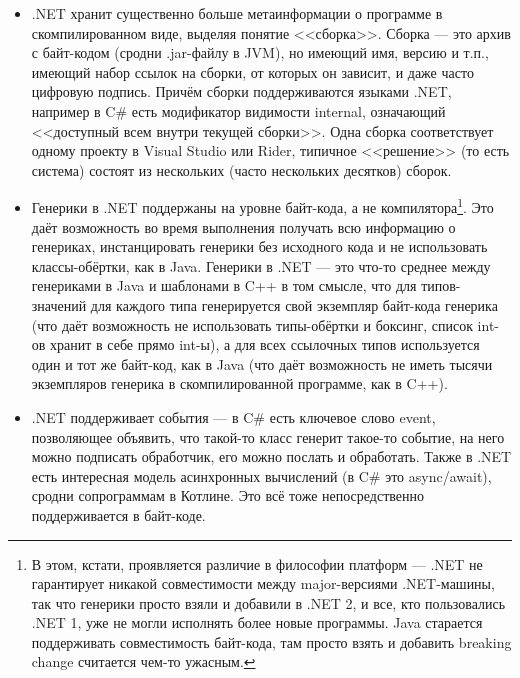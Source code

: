 \documentclass[a5paper]{article}
\begin{document}
\begin{itemize}
    \item .NET хранит существенно больше метаинформации о программе в скомпилированном виде, выделяя понятие <<сборка>>. Сборка --- это архив с байт-кодом (сродни .jar-файлу в JVM), но имеющий имя, версию и т.п., имеющий набор ссылок на сборки, от которых он зависит, и даже часто цифровую подпись. Причём сборки поддерживаются языками .NET, например в C\# есть модификатор видимости internal, означающий <<доступный всем внутри текущей сборки>>. Одна сборка соответствует одному проекту в Visual Studio или Rider, типичное <<решение>> (то есть система) состоят из нескольких (часто нескольких десятков) сборок.
    \item Генерики в .NET поддержаны на уровне байт-кода, а не компилятора\footnote{В этом, кстати, проявляется различие в философии платформ --- .NET не гарантирует никакой совместимости между major-версиями .NET-машины, так что генерики просто взяли и добавили в .NET 2, и все, кто пользовались .NET 1, уже не могли исполнять более новые программы. Java старается поддерживать совместимость байт-кода, там просто взять и добавить breaking change считается чем-то ужасным.}. Это даёт возможность во время выполнения получать всю информацию о генериках, инстанцировать генерики без исходного кода и не использовать классы-обёртки, как в Java. Генерики в .NET --- это что-то среднее между генериками в Java и шаблонами в C++ в том смысле, что для типов-значений для каждого типа генерируется свой экземпляр байт-кода генерика (что даёт возможность не использовать типы-обёртки и боксинг, список int-ов хранит в себе прямо int-ы), а для всех ссылочных типов используется один и тот же байт-код, как в Java (что даёт возможность не иметь тысячи экземпляров генерика в скомпилированной программе, как в C++).
    \item .NET поддерживает события --- в C\# есть ключевое слово event, позволяющее объявить, что такой-то класс генерит такое-то событие, на него можно подписать обработчик, его можно послать и обработать. Также в .NET есть интересная модель асинхронных вычислений (в C\# это async/await), сродни сопрограммам в Котлине. Это всё тоже непосредственно поддерживается в байт-коде.
\end{itemize}
\end{document}
